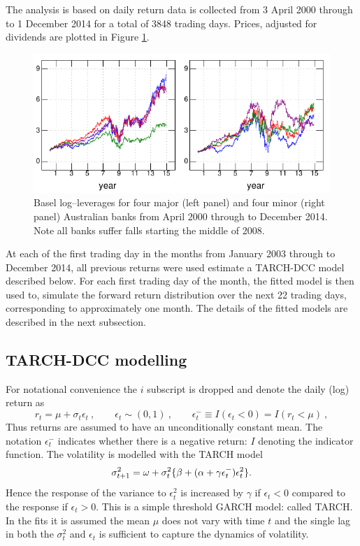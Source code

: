 \documentclass[authoryear]{elsarticle}
\newcommand{\eps}{\epsilon}
\newcommand{\fref}[1]{Figure \ref{#1}}
\newcommand{\cq}{\ , \qquad}
\newcommand{\be}[1]{\begin{equation}\label{#1}}
\newcommand{\ee}{\end{equation}}
\begin{document}
The analysis is based on daily return data is collected from   3 April 2000 through to 1 December 2014 for a total of  3848 trading days.
Prices, adjusted for dividends are plotted in \fref{prices}.

\begin{figure}[htbp]
\begin{center}
\includegraphics{prices.pdf}
\caption{Basel log--leverages for four major (left panel) and four minor (right panel) Australian banks from April 2000 through to December 2014.  Note all banks suffer  falls starting the middle of 2008.}
\label{prices}
\end{center}
\end{figure}
 
At each of the first trading day in the months from January 2003 through to December 2014,  all previous returns were used estimate a TARCH-DCC model described below.   For each first trading day of the month, the fitted model is then used to, simulate the forward return distribution over the next 22 trading days, corresponding to approximately one month.  The details of the fitted models are described in the next subsection.

\subsection{TARCH-DCC modelling}

For notational convenience the $i$ subscript is dropped and denote the daily (log) return as
\newcommand{\vareps}{\varepsilon}
\be{mean.model}
r_{t}=\mu+\sigma_t\eps_t\cq \eps_t\sim (0,1)\cq  \eps^-_t\equiv I(\eps_t<0)=I(r_t<\mu)\ ,
\ee
Thus returns are assumed to have an unconditionally constant mean.   The notation $\eps_t^-$ indicates whether there is a negative return:  $I$ denoting the indicator function.  The volatility is modelled with the TARCH model
\be{vol}
\sigma_{t+1}^2 = \omega+ \sigma^2_t\{\beta+(\alpha+\gamma \eps^-_t)\eps_{t}^2\}\\ .
\ee
Hence the response of the variance to $\eps_t^2$  is increased by $\gamma$   if $\eps_{t}<0$ compared to the response if $\eps_t>0$.  This is a simple threshold GARCH model:  called TARCH.   In the fits it is assumed the mean $\mu$ does not vary with time $t$ and the single lag in both the $\sigma_t^2$ and $\eps_t$ is sufficient to capture the dynamics of volatility. 
\end{document}
